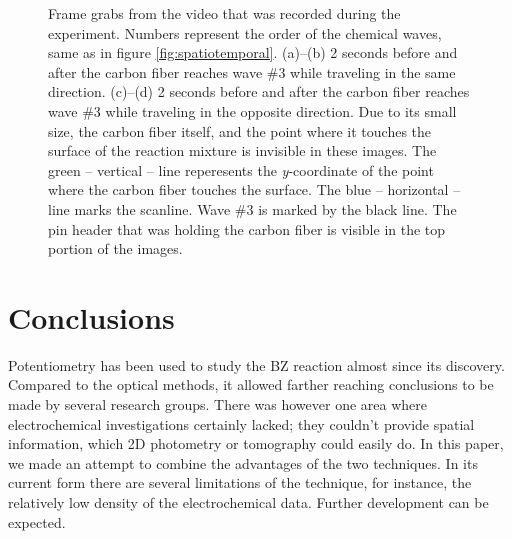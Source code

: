 \documentclass[3p, twocolumn]{elsarticle}
\begin{document}
\begin{figure}
\centering
{}
\caption{Frame grabs from the video that was recorded during the experiment.
Numbers represent the order of the chemical waves, same as in figure \ref{fig:spatiotemporal}.
(a)--(b) 2 seconds before and after the carbon fiber reaches wave \#3 while traveling in the same direction.
(c)--(d) 2 seconds before and after the carbon fiber reaches wave \#3 while traveling in the opposite direction.
Due to its small size, the carbon fiber itself, and the point where it touches the surface of the reaction mixture is invisible in these images.
The green -- vertical -- line reperesents the \emph{y}-coordinate of the point where the carbon fiber touches the surface.
The blue -- horizontal -- line marks the scanline.
Wave \#3 is marked by the black line.
The pin header that was holding the carbon fiber is visible in the top portion of the images.
}
\label{fig:grabs2}
\end{figure}

\section{Conclusions}
Potentiometry has been used to study the BZ reaction almost since its discovery.
Compared to the optical methods, it allowed farther reaching conclusions to be made by several research groups.
There was however one area where electrochemical investigations certainly lacked; they couldn't provide spatial information, which 2D photometry or tomography could easily do.
In this paper, we made an attempt to combine the advantages of the two techniques.
In its current form there are several limitations of the technique, for instance, the relatively low density of the electrochemical data.
Further development can be expected.
\end{document}
